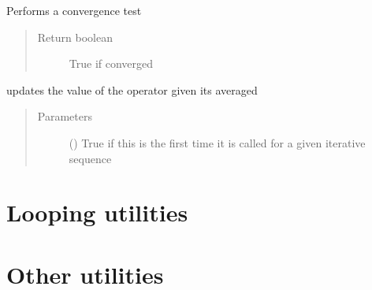 \documentclass[letterpaper,10pt,english]{sphinxmanual}
\begin{document}
\begin{fulllineitems}
\begin{fulllineitems}
\label{\detokenize{utilities:pyqcm.hartree.counterterm.converged}}
\sphinxAtStartPar
Performs a convergence test
\begin{quote}\begin{description}
\item[{Return boolean}] \leavevmode
\sphinxAtStartPar
True if converged

\end{description}\end{quote}

\end{fulllineitems}


\begin{fulllineitems}
\label{\detokenize{utilities:pyqcm.hartree.counterterm.update}}
\sphinxAtStartPar
updates the value of the operator given its averaged
\begin{quote}\begin{description}
\item[{Parameters}] \leavevmode
\sphinxAtStartPar
{} () \textendash{} True if this is the first time it is called for a given iterative sequence

\end{description}\end{quote}

\end{fulllineitems}


\end{fulllineitems}



\chapter{Looping utilities}
\label{\detokenize{utilities:looping-utilities}}

\chapter{Other utilities}
\label{\detokenize{utilities:other-utilities}}
\end{document}
